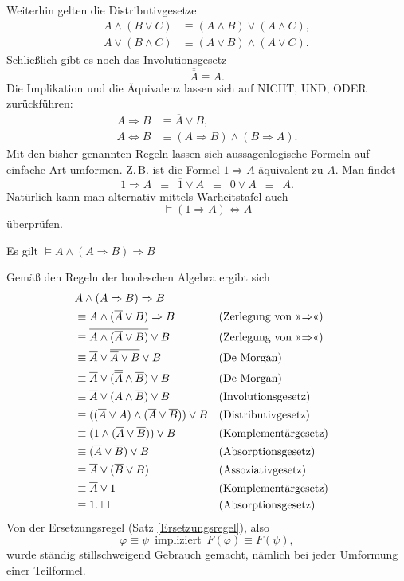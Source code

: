 Weiterhin gelten die Distributivgesetze
\begin{align}
A\land(B\lor C) &\equiv (A\land B)\lor (A\land C),\\
A\lor(B\land C) &\equiv (A\lor B)\land (A\lor C).
\end{align}
Schließlich gibt es noch das Involutionsgesetz
\begin{equation}
\overline {\overline A}\equiv A.
\end{equation}
Die Implikation und die Äquivalenz lassen sich auf NICHT, UND, ODER
zurückführen:%
\begin{align}
A\Rightarrow B &\equiv \overline A\lor B,\\
A\Leftrightarrow B &\equiv (A\Rightarrow B)\land (B\Rightarrow A).
\end{align}
Mit den bisher genannten Regeln lassen sich aussagenlogische Formeln
auf einfache Art umformen. Z.\,B. ist die Formel $1\Rightarrow A$
äquivalent zu $A$. Man findet
\[1\Rightarrow A\enspace\equiv\enspace\overline 1\lor A\enspace\equiv\enspace 0\lor A\enspace\equiv\enspace A.\]
Natürlich kann man alternativ mittels Warheitstafel auch
\[\models(1\Rightarrow A)\Leftrightarrow A\]
überprüfen.

\begin{Satz}\label{Formel-Modus-ponens}
Es gilt $\models A\land (A\Rightarrow B)\Rightarrow B$
\end{Satz}
 Gemäß den Regeln der booleschen Algebra ergibt sich
\begin{align}
& A\land (A\Rightarrow B)\Rightarrow B\\
& \equiv A\land (\overline A\lor B)\Rightarrow B && \text{(Zerlegung von »$\Rightarrow$«)}\\
& \equiv \overline{A\land (\overline A\lor B)}\lor B && \text{(Zerlegung von »$\Rightarrow$«)}\\
& \equiv \overline A\lor\overline{\overline A\lor B}\lor B && \text{(De Morgan)}\\
& \equiv \overline A\lor (\overline{\overline A}\land\overline B)\lor B && \text{(De Morgan)}\\
& \equiv \overline A\lor (A\land\overline B)\lor B && \text{(Involutionsgesetz)}\\
& \equiv ((\overline A\lor A)\land(\overline A\lor\overline B))\lor B && \text{(Distributivgesetz)}\\
& \equiv (1\land(\overline A\lor\overline B))\lor B && \text{(Komplementärgesetz)}\\
& \equiv (\overline A\lor\overline B)\lor B && \text{(Absorptionsgesetz)}\\
& \equiv \overline A\lor(\overline B\lor B) && \text{(Assoziativgesetz)}\\
& \equiv \overline A\lor 1 && \text{(Komplementärgesetz)}\\
& \equiv 1.\;\Box && \text{(Absorptionsgesetz)}
\end{align}
Von der Ersetzungsregel (Satz \ref{Ersetzungsregel}), also
\[\varphi\equiv\psi\enspace
\text{impliziert}\enspace F(\varphi)\equiv F(\psi),\]
wurde ständig stillschweigend Gebrauch gemacht, nämlich bei jeder
Umformung einer Teilformel.

